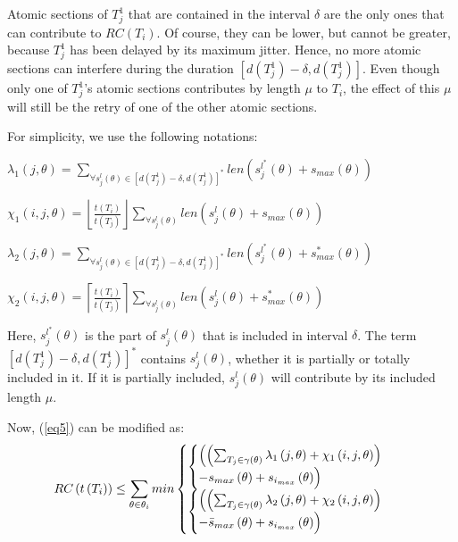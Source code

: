 \documentclass[a4paper,english]{article}
\begin{document}
Atomic sections of $T_{j}^{1}$ that are contained in the interval $\delta$
are the only ones that can contribute to $RC(T_{i})$. Of course, they can be lower, but cannot be greater, because $T_{j}^{1}$ has been delayed by its maximum jitter. Hence, no more atomic sections
can interfere during the duration 
$[d(T_{j}^{1})-\delta,d(T_{j}^{1})]$. Even though only one of $T_j^1$'s atomic sections contributes by length $\mu$ to $T_i$, the effect of this $\mu$ will still be the retry of one of the other atomic sections. 

For simplicity, we use the following notations:
\begin{compactitem}
\item $\lambda_{1}\left(j,\theta\right)=\sum_{\forall s_{j}^{l}\left(\theta\right)\in\left[d\left(T_{j}^{1}\right)-\delta,d\left(T_{j}^{1}\right)\right]^{*}}len\left(s_{j}^{l^{*}}\left(\theta\right)+s_{max}\left(\theta\right)\right)$
\item $\chi_{1}\left(i,j,\theta\right)=\left\lfloor\frac{t\left(T_{i}\right)}{t\left(T_{j}\right)}\right\rfloor\sum_{\forall s_{j}^{l}\left(\theta\right)}len\left(s_{j}^{l}\left(\theta\right)+s_{max}\left(\theta\right)\right)$
\item $\lambda_{2}\left(j,\theta\right)=\sum_{\forall s_{j}^{l}\left(\theta\right)\in\left[d\left(T_{j}^{1}\right)-\delta,d\left(T_{j}^{1}\right)\right]^{*}}len\left(s_{j}^{l^{*}}\left(\theta\right)+s_{max}^{*}\left(\theta\right)\right)$
\item $\chi_{2}\left(i,j,\theta\right)=\left\lceil\frac{t\left(T_{i}\right)}{t\left(T_{j}\right)}\right\rceil\sum_{\forall s_{j}^{l}\left(\theta\right)}len\left(s_{j}^{l}\left(\theta\right)+s_{max}^{*}\left(\theta\right)\right)$
\end{compactitem}
Here, $s_{j}^{l^{*}}\left(\theta\right)$ is the part of $s_{j}^{l}\left(\theta\right)$ that
is included in interval $\delta$. The term $\left[d\left(T_{j}^{1}\right)-\delta,d\left(T_{j}^{1}\right)\right]^{*}$ contains $s_{j}^{l}\left(\theta\right)$, whether it is partially or totally included in it. If it is partially included, $s_{j}^{l}(\theta)$
will contribute by its included length $\mu$.

Now, (\ref{eq5}) can be modified as:
\begin{equation}
RC_{}\left(t\left(T_{i}\right)\right)\le \sum_{\theta\in\theta_{i}}min\begin{cases}
\begin{cases}
\Bigl(\left(\sum_{T_{j}\in\gamma\left(\theta\right)}\lambda_{1}\left(j,\theta\right)+\chi_{1}\left(i,j,\theta\right)\right)\\
-s_{max}\left(\theta\right)+s_{i_{max}}\left(\theta\right)\Bigr)\end{cases}\\
\begin{cases}
\Bigl(\left(\sum_{T_{j}\in\gamma\left(\theta\right)}\lambda_{2}\left(j,\theta\right)+\chi_{2}\left(i,j,\theta\right)\right)\\
-\bar{s}_{max}\left(\theta\right)+s_{i_{max}}\left(\theta\right)\Bigr)\end{cases}\end{cases}\label{eq15}\end{equation}
\end{document}
